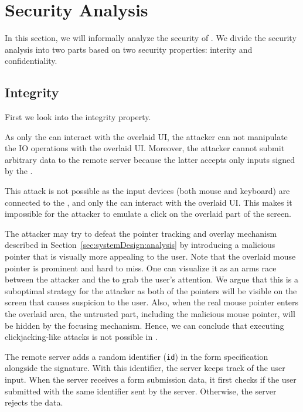 \section{Security Analysis}
\label{sec:securityAnalysis}

In this section, we will informally analyze the security of \name. We divide the security analysis into two parts based on two security properties: interity and confidentiality.

\subsection{Integrity}
\label{sec:securityAnalysis:integrity}

First we look into the integrity property.

 As only the \device can interact with the overlaid UI, the attacker can not manipulate the IO operations with the overlaid UI. Moreover, the attacker cannot submit arbitrary data to the remote server because the latter accepts only inputs signed by the \device.


 This attack is not possible as the input devices (both mouse and keyboard) are connected to the \device, and only the \device can interact with the overlaid UI. This makes it impossible for the attacker to emulate a click on the overlaid part of the screen.  


The attacker may try to defeat the \name pointer tracking and overlay mechanism described in Section~\ref{sec:systemDesign:analysis} by introducing a malicious pointer that is visually more appealing to the user. Note that the \device overlaid mouse pointer is prominent and hard to miss. One can visualize it as an arms race between the attacker and the \device to grab the user's attention. We argue that this is a suboptimal strategy for the attacker as both of the pointers will be visible on the screen that causes suspicion to the user. Also, when the real mouse pointer enters the overlaid area, the untrusted part, including the malicious mouse pointer, will be hidden by the focusing mechanism. Hence, we can conclude that executing clickjacking-like attacks is not possible in \name.


 The remote server adds a random identifier (\texttt{id}) in the form specification alongside the signature. With this identifier, the server keeps track of the user input. When the server receives a form submission data, it first checks if the user submitted with the same identifier sent by the server. Otherwise, the server rejects the data. 


